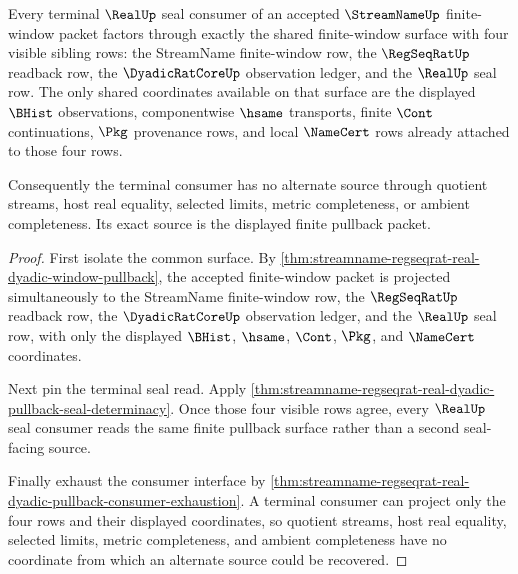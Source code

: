 \begin{theorem}
\label{thm:streamname-regseqrat-real-terminal-pullback-exactness}
Every terminal $\RealUp$ seal consumer of an accepted $\StreamNameUp$ finite-window packet factors through exactly the shared finite-window surface with four visible sibling rows: the StreamName finite-window row, the $\RegSeqRatUp$ readback row, the $\DyadicRatCoreUp$ observation ledger, and the $\RealUp$ seal row. The only shared coordinates available on that surface are the displayed $\BHist$ observations, componentwise $\hsame$ transports, finite $\Cont$ continuations, $\Pkg$ provenance rows, and local $\NameCert$ rows already attached to those four rows.

Consequently the terminal consumer has no alternate source through quotient streams, host real equality, selected limits, metric completeness, or ambient completeness. Its exact source is the displayed finite pullback packet.
\end{theorem}
\begin{proof}
First isolate the common surface. By \autoref{thm:streamname-regseqrat-real-dyadic-window-pullback}, the accepted finite-window packet is projected simultaneously to the StreamName finite-window row, the $\RegSeqRatUp$ readback row, the $\DyadicRatCoreUp$ observation ledger, and the $\RealUp$ seal row, with only the displayed $\BHist$, $\hsame$, $\Cont$, $\Pkg$, and $\NameCert$ coordinates.

Next pin the terminal seal read. Apply \autoref{thm:streamname-regseqrat-real-dyadic-pullback-seal-determinacy}. Once those four visible rows agree, every $\RealUp$ seal consumer reads the same finite pullback surface rather than a second seal-facing source.

Finally exhaust the consumer interface by \autoref{thm:streamname-regseqrat-real-dyadic-pullback-consumer-exhaustion}. A terminal consumer can project only the four rows and their displayed coordinates, so quotient streams, host real equality, selected limits, metric completeness, and ambient completeness have no coordinate from which an alternate source could be recovered.
\end{proof}

